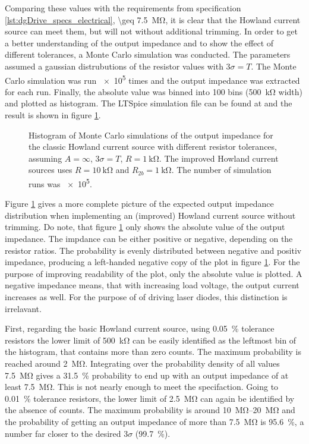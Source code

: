 Comparing these values with the requirements from specification \ref{lst:dgDrive_specs_electrical}, \qty{\geq 7.5}{\mega \ohm}, it is clear that the Howland current source can meet them, but will not without additional trimming. In order to get a better understanding of the output impedance and to show the effect of different tolerances, a Monte Carlo simulation was conducted. The parameters assumed a gaussian distrubutions of the resistor values with $3 \sigma = T$. The Monte Carlo simulation was run \num{e5} times and the output impedance was extracted for each run. Finally, the absolute value was binned into \num{100} bins (\qty{500}{\kilo\ohm} width) and plotted as histogram. The LTSpice simulation file can be found at  and the result is shown in figure \ref{fig:ltpsice_howland_mc_output_impedance}.
\begin{figure}[hb]
    \centering
    
    \caption{Histogram of Monte Carlo simulations of the output impedance for the classic Howland current source with different resistor tolerances, assuming $A = \infty$, $3 \sigma = T$, $R=\qty{1}{\kilo\ohm}$. The improved Howland current sources uses $R = \qty{10}{\kilo\ohm}$ and $R_{2b} = \qty{1}{\kilo\ohm}$. The number of simulation runs was \num{e5}.}
    \label{fig:ltpsice_howland_mc_output_impedance}
\end{figure}

Figure \ref{fig:ltpsice_howland_mc_output_impedance} gives a more complete picture of the expected output impedance distribution when implementing an (improved) Howland current source without trimming. Do note, that figure \ref{fig:ltpsice_howland_mc_output_impedance} only shows the absolute value of the output impedance. The impdance can be either positive or negative, depending on the resistor ratios. The probability is evenly distributed between negative and positiv impedance, producing a left-handed negative copy of the plot in figure \ref{fig:ltpsice_howland_mc_output_impedance}. For the purpose of improving readability of the plot, only the absolute value is plotted. A negative impedance means, that with increasing load voltage, the output current increases as well. For the purpose of of driving laser diodes, this distinction is irrelavant.

First, regarding the basic Howland current source, using \qty{0.05}{\percent} tolerance resistors the lower limit of \qty{500}{\kilo\ohm} can be easily identified as the leftmost bin of the histogram, that contains more than zero counts. The maximum probability is reached around \qty{2}{\mega\ohm}. Integrating over the probability density of all values \qty{7.5}{\mega\ohm} gives a \qty{31.5}{\percent} probability to end up with an output impedance of at least \qty{7.5}{\mega\ohm}. This is not nearly enough to meet the specifaction. Going to \qty{0.01}{\percent} tolerance resistors, the lower limit of \qty{2.5}{\mega\ohm} can again be identified by the absence of counts. The maximum probability is around \qtyrange{10}{20}{\mega\ohm} and the probability of getting an output impedance of more than \qty{7.5}{\mega\ohm} is \qty{95.6}{\percent}, a number far closer to the desired $3\sigma$ (\qty{99.7}{\percent}).

